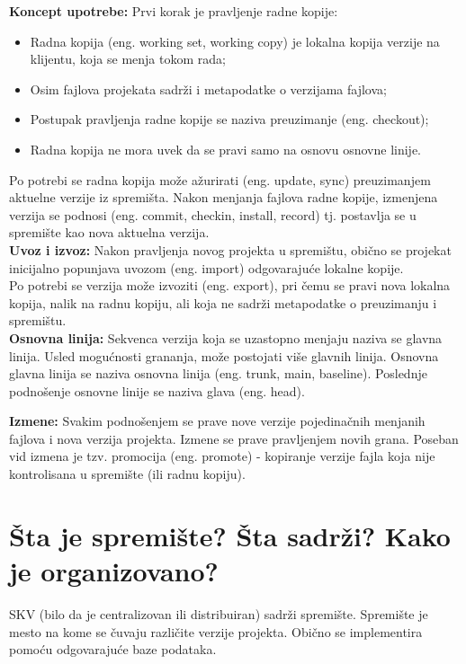 \documentclass[a4paper]{article}
\begin{document}
  \textbf{Koncept upotrebe:} Prvi korak je pravljenje radne kopije:
  \begin{itemize}
    \item Radna kopija (eng. working set, working copy) je lokalna kopija verzije na klijentu, 
          koja se menja tokom rada;
    \item Osim fajlova projekata sadrži i metapodatke o verzijama fajlova;
    \item Postupak pravljenja radne kopije se naziva preuzimanje (eng. checkout);
    \item Radna kopija ne mora uvek da se pravi samo na osnovu osnovne linije.
  \end{itemize}
  Po potrebi se radna kopija može ažurirati (eng. update, sync) preuzimanjem aktuelne verzije 
  iz spremišta. Nakon menjanja fajlova radne kopije, izmenjena verzija se podnosi 
  (eng. commit, checkin, install, record) tj. postavlja se u spremište kao nova aktuelna verzija.\\
  
  \textbf{Uvoz i izvoz:} Nakon pravljenja novog projekta u spremištu, obično se projekat inicijalno 
  popunjava uvozom (eng. import) odgovarajuće lokalne kopije.\\
  \indent Po potrebi se verzija može izvoziti (eng. export), pri čemu se pravi nova lokalna kopija, 
  nalik na radnu kopiju, ali koja ne sadrži metapodatke o preuzimanju i spremištu.\\
  
  \textbf{Osnovna linija:} Sekvenca verzija koja se uzastopno menjaju naziva se glavna linija. 
  Usled mogućnosti grananja, može postojati više glavnih linija. Osnovna glavna linija se naziva 
  osnovna linija (eng. trunk, main, baseline). Poslednje podnošenje osnovne linije se naziva 
  glava (eng. head).
  
  \textbf{Izmene:} Svakim podnošenjem se prave nove verzije pojedinačnih menjanih fajlova i 
  nova verzija projekta. Izmene se prave pravljenjem novih grana. Poseban vid izmena je tzv. 
  promocija (eng. promote) - kopiranje verzije fajla koja nije kontrolisana u spremište 
  (ili radnu kopiju).
   
\section{Šta je spremište? Šta sadrži? Kako je organizovano?}
  SKV (bilo da je centralizovan ili distribuiran) sadrži spremište. 
  Spremište je mesto na kome se čuvaju različite verzije projekta. 
  Obično se implementira pomoću odgovarajuće baze podataka.
\end{document}
